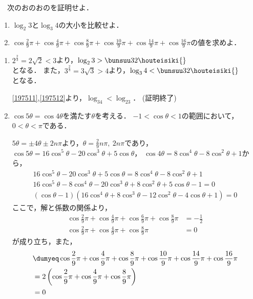 \begin{problem}
  　次のおのおのを証明せよ．
\begin{enumerate}
\item  $\log_2 3$と$\log_3 4$の大小を比較せよ．
\item $\displaystyle\cos\frac{2}{9}\pi+\cos\frac{4}{9}\pi+\cos\frac{8}{9}\pi+
\cos\frac{10}{9}\pi+\cos\frac{14}{9}\pi+\cos\frac{16}{9}\pi$の値を求めよ．
\end{enumerate}
\end{problem}

\begin{enumerate}
  \item $2^{\frac23} = 2\sqrt2 < 3$より，$\log_23 > \bunsuu32 \houteisiki{\label{197511}}$\\ となる．
  また，$3^{\frac23} = 3\sqrt3 > 4$より，$\log_34 < \bunsuu32 \houteisiki{\label{197512}}$\\となる．

  \eqref{197511},\eqref{197512}より，$\log_34 < \log_23$．
  \hfill
  (証明終了)

  \item
  $\cos5\theta = \cos4\theta$を満たす$\theta$を考える．
  $-1 < \cos\theta < 1$の範囲において，$0 < \theta < \pi$である．

  $5\theta = \pm 4\theta\pm 2n\pi$より，$ \theta = \frac29n\pi,\ 2n\pi$であり，
  $\cos5\theta = 16\cos^5\theta - 20\cos^3\theta + 5\cos\theta$，
  $\cos4\theta = 8\cos^4\theta - 8\cos^2\theta + 1$から，
  \begin{align*}
    16\cos^5\theta - 20\cos^3\theta + 5\cos\theta = 8\cos^4\theta - 8\cos^2\theta + 1　\\
    16\cos^5\theta - 8\cos^4\theta -20\cos^3\theta + 8\cos^2\theta + 5\cos\theta -1 = 0 \\
    (\cos\theta -1)(16\cos^4\theta + 8\cos^3\theta-12\cos^2\theta-4\cos\theta +1) = 0
  \end{align*}
  ここで，解と係数の関係より，
  \begin{align*}
    \cos\frac29\pi + \cos\frac49\pi + \cos\frac69\pi +\cos\frac89\pi &= -\frac12\\
    \cos\frac29\pi + \cos\frac49\pi +\cos\frac89\pi &= 0
  \end{align*}
  が成り立ち，また，
  \begin{align*}
    &\dumyeq\cos\frac29\pi + \cos\frac49\pi +\cos\frac89\pi + \cos\frac{10}{9}\pi + \cos\frac{14}{9}\pi + \cos\frac{16}9\pi\\
    &=2\left(\cos\frac29\pi + \cos\frac49\pi +\cos\frac89\pi\right) \\
    &= 0
  \end{align*}

\end{enumerate}
